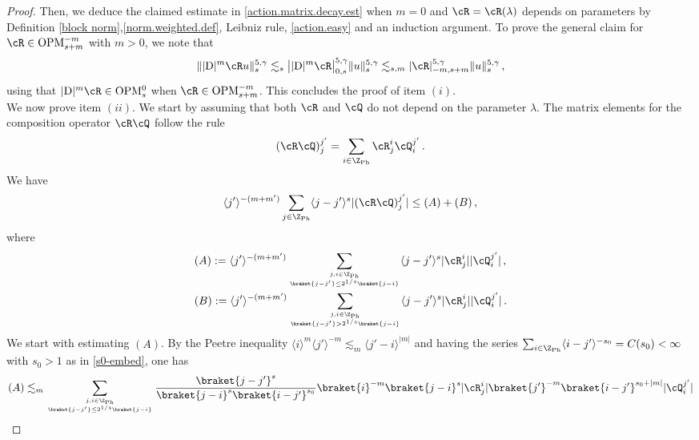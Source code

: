 \documentclass[a4paper,reqno,10pt]{article}
\newcommand{\OpM}{{\rm O}{\rm P}{\rm M}}
\begin{document}
\begin{proof}
Then, we deduce the claimed estimate in \eqref{action.matrix.decay.est} when $m=0$ and $\cR=\cR(\lambda)$ depends on parameters by Definition \ref{block norm},{\eqref{norm.weighted.def}}, Leibniz rule,  \eqref{action.easy} and an induction argument.
 To prove the general claim for $\cR \in \OpM_{s+m}^{-m}$ with $m>0$, we note that
\begin{align}
    \| |{\rm D}|^{m}\cR u \|_{s}^{5,\gamma} \lesssim_{s} \big| |{\rm D}|^m \cR \big|_{0,s}^{5,\gamma}  \| u \|_{s}^{5,\gamma} \lesssim_{s,m} |\cR|_{-m,s+m}^{5,\gamma}  \| u \|_{s}^{5,\gamma} \,,
\end{align}
using that $|{\rm D}|^m \cR \in \OpM_{s}^{0}$ when  $\cR \in \OpM_{s+m}^{-m}$. This concludes the proof of item $(i)$.
\\[1mm]
We now prove item $(ii)$.
 We start by assuming that both $\cR$ and $\cQ$ do not depend on the parameter $\lambda$. The matrix elements for the composition operator $\cR\cQ$ follow the rule
\begin{equation}
	(\cR\cQ)_j^{j'} = \sum_{i \in \Z_{\rm Ph}} \cR_{j}^{i} \cQ_{i}^{j'}\,.
\end{equation}
We have
\begin{align}
\langle j' \rangle^{ - (m + m')} \sum_{j\in \Z_{\rm Ph}} \langle  j - j' \rangle^{s} |	(\cR\cQ)_j^{j'}| \leq (A) + (B) \,, \label{paris 0} 
\end{align}
where 
\begin{align}
&
(A) :=  \langle j' \rangle^{- (m + m')} \sum_{j,i \in \Z_{\rm Ph} \atop \braket{j-j'}\leq 2^{1/s}\braket{j-i}} \langle j - j' \rangle^{s} |\cR_j^{i} | | \cQ_{i}^{j'} | \,,  \nonumber	
\\
&
(B) := \langle j' \rangle^{- (m + m')}\sum_{j,i \in \Z_{\rm Ph} \atop  \braket{j-j'}> 2^{1/s}\braket{j-i}} \langle  j - j'  \rangle^{s} |\cR_j^{i}| | \cQ_{i}^{j'} |  \,.\nonumber 
\end{align}
We start with estimating $(A)$. 
By the Peetre inequality 
$
\langle i \rangle^m\langle j' \rangle^{- m} \lesssim_m  \langle j' - i \rangle^{|m|}
$ and having the series $\sum_{i \in \Z_{\rm Ph}} \langle  i - j'\rangle^{-s_{0}}  = C(s_{0})<\infty$ with $s_0>1$ as in \eqref{s0-embed},
one has
\begin{align}
    (A) & \lesssim_{m}  \sum_{j,i \in \Z_{\rm Ph} \atop \braket{j-j'}\leq 2^{1/s}\braket{j-i}} \frac{\braket{j-j'}^{s}}{\braket{j-i}^{s}\braket{i-j'}^{s_{0}}} \braket{i}^{-m}\braket{j-i}^{s} |\cR_{j}^{i}| \braket{j'}^{-m}\braket{i-j'}^{s_{0}+|m|} |\cQ_{i}^{j'}| \\

\end{align}
\end{proof}
\end{document}
